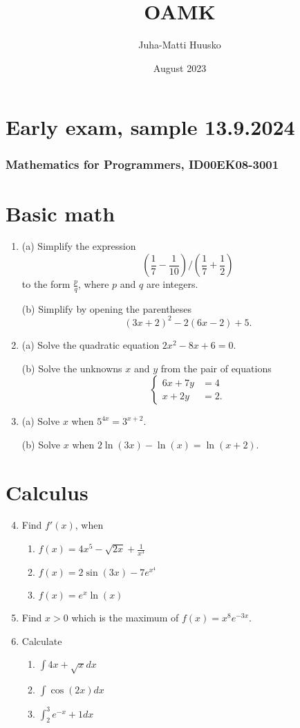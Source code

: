 \documentclass[12pt]{article}
\title{OAMK}
\author{Juha-Matti Huusko}
\date{August 2023}
\renewcommand{\ratkaisu}[1]{{\color{blue}\quad\textrm{Ratkaisu: } #1}}
\renewcommand{\ratkaisu}[1]{}
\begin{document}
\thispagestyle{empty}

\section*{Early exam, sample 13.9.2024}
\subsubsection*{Mathematics for Programmers, ID00EK08-3001}

\section*{Basic math}

\begin{enumerate}
\item 
(a) Simplify the expression
$$
\left(\frac{1}{7}-\frac{1}{10}\right)\bigg/\left(\frac{1}{7}+\frac{1}{2}\right)\ratkaisu{1/25}
$$
to the form $\frac{p}{q}$, where $p$ and $q$ are integers.

(b) Simplify by opening the parentheses
$$
(3x+2)^2-2(6x-2)+5.\ratkaisu{9x^2+13}
$$

\item (a) Solve the quadratic equation
$2x^2-8x+6=0$.%

(b) Solve the unknowns $x$ and $y$ from the pair of equations
$$
\begin{cases}
6x+7y&=4\\
x+2y&=2.
\end{cases}\ratkaisu{y=8/5, x=-6/5}
$$


\item (a) Solve $x$ when $5^{4x}=3^{x+2}$.

(b) Solve $x$ when $2\ln(3x)-\ln(x)=\ln(x+2)$.
\end{enumerate}

\section*{Calculus}

\begin{enumerate}
\setcounter{enumi}{3}
\item Find $f'(x)$, when
\begin{enumerate}
\item $f(x)=4x^5-\sqrt{2x}+\frac{1}{x^3}$
\item $f(x)=2\sin(3x)-7e^{x^4}$
\item $f(x)=e^x\ln(x)$
\end{enumerate}
\item  Find $x > 0$ which is the maximum of \(f(x)=x^8e^{-3x}\).
\item Calculate
\begin{enumerate}
\item $\int 4x+\sqrt{x}dx$
\item $\int \cos(2x)dx$
\item $\int_2^3 e^{-x}+1dx$
\end{enumerate}
\end{enumerate}
\end{document}
